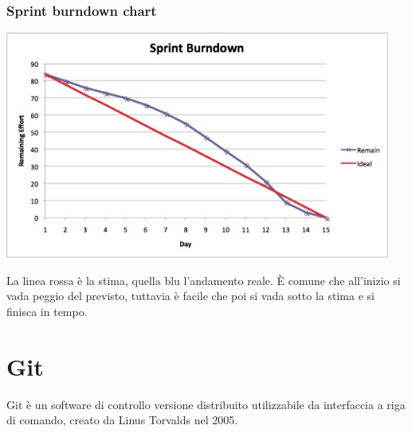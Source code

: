 \documentclass[10pt, a4paper]{article}
\begin{document}
\subsubsection*{Sprint burndown chart}
\begin{minipage}{0.6\textwidth}
\begin{center}
\includegraphics[width=0.95\textwidth]{img/sprint_burndown.jpg}
\end{center}
\end{minipage}
\begin{minipage}{0.4\textwidth}
La linea rossa è la stima, quella blu l'andamento reale. È comune che all'inizio si vada peggio del previsto, tuttavia è facile che poi si vada sotto la stima e si finisca in tempo.
\end{minipage}

\section{Git}
Git è un software di controllo versione distribuito utilizzabile da interfaccia a riga di comando, creato da Linus Torvalds nel 2005.
\end{document}
